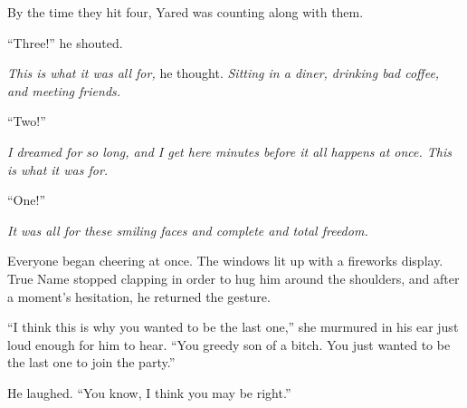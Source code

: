 By the time they hit four, Yared was counting along with them.

``Three!'' he shouted.

\emph{This is what it was all for,} he thought. \emph{Sitting in a diner, drinking bad coffee, and meeting friends.}

``Two!''

\emph{I dreamed for so long, and I get here minutes before it all happens at once. This is what it was for.}

``One!''

\emph{It was all for these smiling faces and complete and total freedom.}

Everyone began cheering at once. The windows lit up with a fireworks display. True Name stopped clapping in order to hug him around the shoulders, and after a moment's hesitation, he returned the gesture.

``I think this is why you wanted to be the last one,'' she murmured in his ear just loud enough for him to hear. ``You greedy son of a bitch. You just wanted to be the last one to join the party.''

He laughed. ``You know, I think you may be right.''
